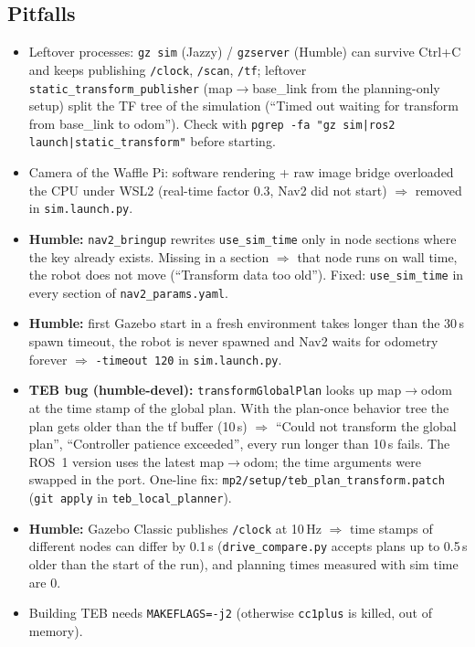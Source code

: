 \documentclass[10pt]{article}
\newcommand{\pkg}[1]{\texttt{#1}}
\begin{document}
\subsection{Pitfalls}
\begin{itemize}
  \item Leftover processes: \pkg{gz sim} (Jazzy) / \pkg{gzserver} (Humble) can survive Ctrl+C and keeps publishing \pkg{/clock}, \pkg{/scan},
        \pkg{/tf}; leftover \pkg{static\_transform\_publisher} (map$\rightarrow$base\_link from the planning-only
        setup) split the TF tree of the simulation (``Timed out waiting for transform from base\_link to odom'').
        Check with \pkg{pgrep -fa "gz sim|ros2 launch|static\_transform"} before starting.
  \item Camera of the Waffle Pi: software rendering + raw image bridge overloaded the CPU under WSL2
        (real-time factor 0.3, Nav2 did not start) $\Rightarrow$ removed in \pkg{sim.launch.py}.
  \item \textbf{Humble:} \pkg{nav2\_bringup} rewrites \pkg{use\_sim\_time} only in node sections where the key already
        exists. Missing in a section $\Rightarrow$ that node runs on wall time, the robot does not move
        (``Transform data too old''). Fixed: \pkg{use\_sim\_time} in every section of \pkg{nav2\_params.yaml}.
  \item \textbf{Humble:} first Gazebo start in a fresh environment takes longer than the 30\,s spawn timeout, the
        robot is never spawned and Nav2 waits for odometry forever $\Rightarrow$ \pkg{-timeout 120} in \pkg{sim.launch.py}.
  \item \textbf{TEB bug (humble-devel):} \pkg{transformGlobalPlan} looks up map$\rightarrow$odom at the time stamp of the
        global plan. With the plan-once behavior tree the plan gets older than the tf buffer (10\,s) $\Rightarrow$
        ``Could not transform the global plan'', ``Controller patience exceeded'', every run longer than 10\,s fails.
        The ROS~1 version uses the latest map$\rightarrow$odom; the time arguments were swapped in the port.
        One-line fix: \pkg{mp2/setup/teb\_plan\_transform.patch} (\pkg{git apply} in \pkg{teb\_local\_planner}).
  \item \textbf{Humble:} Gazebo Classic publishes \pkg{/clock} at 10\,Hz $\Rightarrow$ time stamps of different nodes can
        differ by 0.1\,s (\pkg{drive\_compare.py} accepts plans up to 0.5\,s older than the start of the run), and
        planning times measured with sim time are 0.
  \item Building TEB needs \pkg{MAKEFLAGS=-j2} (otherwise \pkg{cc1plus} is killed, out of memory).

\end{itemize}
\end{document}
